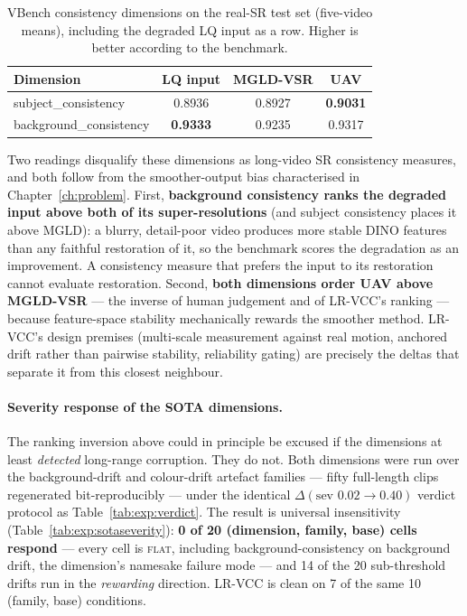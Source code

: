 \begin{table}[h]
\centering
\caption{VBench consistency dimensions on the real-SR test set (five-video
means), including the degraded LQ input as a row. Higher is better according
to the benchmark.}
\label{tab:exp:vbench}
\begin{tabular}{lccc}
\hline
\textbf{Dimension} & \textbf{LQ input} & \textbf{MGLD-VSR} & \textbf{UAV} \\
\hline
subject\_consistency & 0.8936 & 0.8927 & \textbf{0.9031} \\
background\_consistency & \textbf{0.9333} & 0.9235 & 0.9317 \\
\hline
\end{tabular}
\end{table}

Two readings disqualify these dimensions as long-video SR consistency
measures, and both follow from the smoother-output bias characterised in
Chapter~\ref{ch:problem}. First, \textbf{background consistency ranks the
degraded input above both of its super-resolutions} (and subject consistency
places it above MGLD): a blurry, detail-poor video produces more stable DINO
features than any faithful restoration of it, so the benchmark scores the
degradation as an improvement. A consistency measure that prefers the input
to its restoration cannot evaluate restoration. Second, \textbf{both
dimensions order UAV above MGLD-VSR} --- the inverse of human judgement and
of LR-VCC's ranking --- because feature-space stability mechanically rewards
the smoother method. LR-VCC's design premises (multi-scale measurement
against real motion, anchored drift rather than pairwise stability,
reliability gating) are precisely the deltas that separate it from this
closest neighbour.

\paragraph{Severity response of the SOTA dimensions.} The ranking inversion
above could in principle be excused if the dimensions at least \emph{detected}
long-range corruption. They do not. Both dimensions were run over the
background-drift and colour-drift artefact families --- fifty full-length
clips regenerated bit-reproducibly --- under the identical
$\Delta(\text{sev } 0.02 \to 0.40)$ verdict protocol as
Table~\ref{tab:exp:verdict}. The result is universal insensitivity
(Table~\ref{tab:exp:sotaseverity}): \textbf{0 of 20 (dimension, family, base)
cells respond} --- every cell is \textsc{flat}, including
background-consistency on background drift, the dimension's namesake failure
mode --- and 14 of the 20 sub-threshold drifts run in the \emph{rewarding}
direction. LR-VCC is clean on 7 of the same 10 (family, base) conditions.

